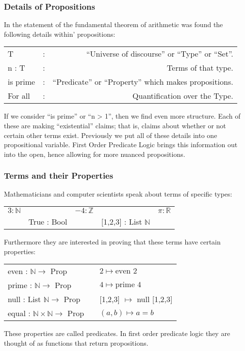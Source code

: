 \documentclass{beamer}
\theoremstyle{indentDefn} \newtheorem{defn}[]{Definition}
\begin{document}
\begin{frame}
	\frametitle{Details of Propositions}
	
	In the statement of the fundamental theorem of arithmetic was found the following details within' propositions: 

	\begin{tabular}{l c r}
		T & : & ``Universe of discourse'' or ``Type'' or ``Set''. \\
		n : T & : & Terms of that type. \\
		is prime & : & ``Predicate'' or ``Property'' which makes propositions. \\
		For all & : & Quantification over the Type. 
	\end{tabular}

	If we consider ``is prime'' or ``n > 1'', then we find even more structure. Each of these are making ``existential'' claims; that is, claims about whether or not certain other terms exist. Previously we put all of these details into one propositional variable. First Order Predicate Logic brings this information out into the open, hence allowing for more nuanced propositions. 

\end{frame}

\begin{frame}
\frametitle{Terms and their Properties}

	Mathematicians and computer scientists speak about terms of specific types:

	\begin{tabular}{c c c c c}
		$3 : \mathbb{N}$ & & $-4 : \mathbb{Z}$ & & $\pi : \mathbb{R}$  \\
		 & True : Bool & & [1,2,3] : List $\mathbb{N}$ & 	
	\end{tabular}

	Furthermore they are interested in proving that these terms have certain properties: 

	\begin{center}
		\begin{tabular}{l c l}
			even : $\mathbb{N} \to $ Prop & & $2 \mapsto \text{even } 2$ \\
			prime : $\mathbb{N} \to $ Prop & & $4 \mapsto \text{prime } 4$ \\
			null : List $\mathbb{N} \to $ Prop & & [1,2,3] $\mapsto$ null [1,2,3] \\
			equal : $\mathbb{N}\times\mathbb{N} \to $ Prop & & $(a,b) \mapsto a = b$
		\end{tabular}
	\end{center}

	These properties are called predicates. In first order predicate logic they are thought of as functions that return propositions. 

\end{frame}
\end{document}
